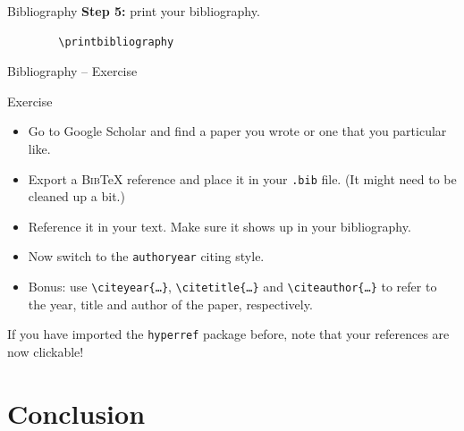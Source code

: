 \documentclass{beamer}
\newcommand{\code}[1]{\texttt{#1}}
\newcommand{\filename}[1]{\texttt{#1}}
\newcommand{\command}[2]{\texttt{\textbackslash#1\{#2\}}}
\begin{document}
\begin{frame}[fragile]{Bibliography}
    \textbf{Step 5:} print your bibliography.
    \medskip

    {\centering
        \begin{verbatim}
        \printbibliography
    \end{verbatim}}
    \printbibliography
\end{frame}

\begin{frame}{Bibliography -- Exercise}
    \begin{block}{Exercise}
        \begin{itemize}
            \item Go to Google Scholar and find a paper you wrote or one that you particular like.
            \item Export a \textsc{Bib}\TeX{} reference and place it in your \filename{.bib} file. (It might need to be cleaned up a bit.)
            \item Reference it in your text. Make sure it shows up in your bibliography.
            \item Now switch to the \code{authoryear} citing style.
            \item Bonus: use \command{citeyear}{\ldots}, \command{citetitle}{\ldots} and \command{citeauthor}{\ldots} to refer to the year, title and author of the paper, respectively.
        \end{itemize}
    \end{block}

    \bigskip

    If you have imported the \code{hyperref} package before, note that your references are now clickable!
\end{frame}

\section{Conclusion}
\end{document}
